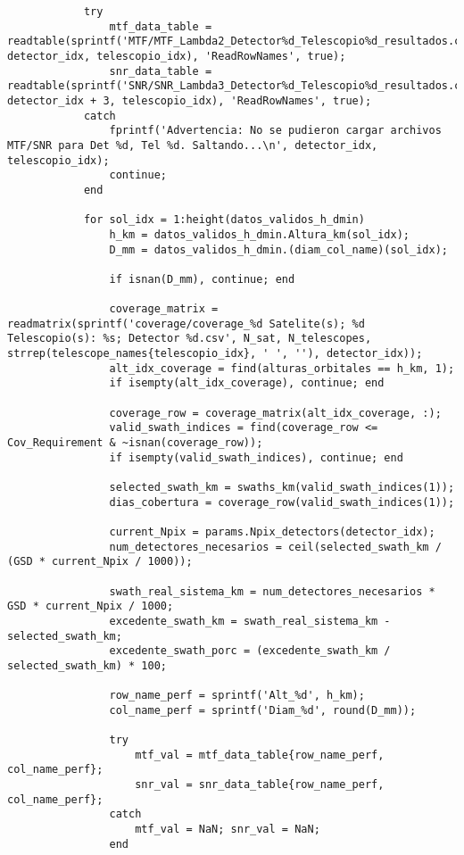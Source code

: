 \begin{verbatim}
            try
                mtf_data_table = readtable(sprintf('MTF/MTF_Lambda2_Detector%d_Telescopio%d_resultados.csv', detector_idx, telescopio_idx), 'ReadRowNames', true);
                snr_data_table = readtable(sprintf('SNR/SNR_Lambda3_Detector%d_Telescopio%d_resultados.csv', detector_idx + 3, telescopio_idx), 'ReadRowNames', true);
            catch
                fprintf('Advertencia: No se pudieron cargar archivos MTF/SNR para Det %d, Tel %d. Saltando...\n', detector_idx, telescopio_idx);
                continue;
            end

            for sol_idx = 1:height(datos_validos_h_dmin)
                h_km = datos_validos_h_dmin.Altura_km(sol_idx);
                D_mm = datos_validos_h_dmin.(diam_col_name)(sol_idx);

                if isnan(D_mm), continue; end

                coverage_matrix = readmatrix(sprintf('coverage/coverage_%d Satelite(s); %d Telescopio(s): %s; Detector %d.csv', N_sat, N_telescopes, strrep(telescope_names{telescopio_idx}, ' ', ''), detector_idx));
                alt_idx_coverage = find(alturas_orbitales == h_km, 1);
                if isempty(alt_idx_coverage), continue; end
                
                coverage_row = coverage_matrix(alt_idx_coverage, :);
                valid_swath_indices = find(coverage_row <= Cov_Requirement & ~isnan(coverage_row));
                if isempty(valid_swath_indices), continue; end
                
                selected_swath_km = swaths_km(valid_swath_indices(1));
                dias_cobertura = coverage_row(valid_swath_indices(1));
                
                current_Npix = params.Npix_detectors(detector_idx);
                num_detectores_necesarios = ceil(selected_swath_km / (GSD * current_Npix / 1000));

                swath_real_sistema_km = num_detectores_necesarios * GSD * current_Npix / 1000;
                excedente_swath_km = swath_real_sistema_km - selected_swath_km;
                excedente_swath_porc = (excedente_swath_km / selected_swath_km) * 100;
                
                row_name_perf = sprintf('Alt_%d', h_km);
                col_name_perf = sprintf('Diam_%d', round(D_mm));
                
                try
                    mtf_val = mtf_data_table{row_name_perf, col_name_perf};
                    snr_val = snr_data_table{row_name_perf, col_name_perf};
                catch
                    mtf_val = NaN; snr_val = NaN;
                end
                

\end{verbatim}
